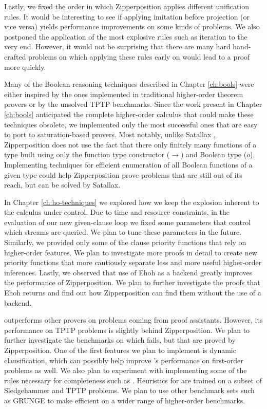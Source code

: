 Lastly, we fixed the order in which Zipperposition applies different unification
rules. It would be interesting to see if applying imitation before projection
(or vice versa) yields performance improvements on some kinds of problems. 
We also postponed the application of the most explosive rules such as iteration
to the very end. However, it would not be surprising that there are many hard hand-crafted
problems on which applying these rules early on would lead to a proof more quickly.

 Many of the Boolean reasoning
techniques described in Chapter \ref{ch:bools} were either inspired by the ones
implemented in traditional higher-order theorem provers or by the unsolved TPTP
benchmarks. Since the work present in Chapter \ref{ch:bools} anticipated the
complete higher-order calculus that could make these techniques obsolete, we
implemented only the most successful ones that are easy to port to
saturation-based provers.  Most notably, unlike Satallax
\cite{cb-2013-satallax}, Zipperposition does not use the fact that there only
finitely many functions of a type built using only the function type constructor
($\rightarrow$) and Boolean type ($o$). Implementing techniques for efficient
enumeration of all Boolean functions of a given type could help Zipperposition
prove problems that are still out of its reach, but can be solved by Satallax.

In Chapter \ref{ch:ho-techniques} we explored how we keep the explosion inherent
to the \osup{} calculus under control. Due to time and resource
constraints, in the evaluation of our new given-clause loop we fixed some
parameters that control which streams are queried. We plan to tune these
parameters in the future.  Similarly, we provided only some of the clause
priority functions that rely on higher-order features. We plan to investigate
more proofs in detail to create new priority functions that more cautiously
separate less and more useful higher-order inferences. Lastly, we observed that
use of Ehoh as a backend greatly improves the performance of Zipperposition. We
plan to further investigate the proofs that Ehoh returns and find out how
Zipperposition can find them without the use of a backend.

 \ehohii{} outperforms other provers on
problems coming from proof assistants. However, its performance on TPTP problems is
slightly behind Zipperposition. We plan to further investigate the benchmarks on
which \ehohii{} fails, but that are proved by Zipperposition. One of the first
features we plan to implement is dynamic clausification, which can possibly help
improve \ehohii{}'s performance on first-order problems as well. We also plan to
experiment with implementing some of the \osup{} rules necessary for
completeness such as . Heuristics for \ehohii{} are trained on
a subset of Sledgehammer and TPTP problems. We plan to use other benchmark sets
such as GRUNGE \cite{bgksu-19-grunge} to make \ehohii{} efficient on a wider range of higher-order
benchmarks.

